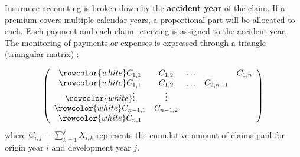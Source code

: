 \begin{f}
	
	Insurance accounting is broken down by the \textbf{accident year} of the claim. 
	If a premium covers multiple calendar years, a proportional part will be allocated to each.
	Each payment and each claim reserving is assigned to the accident year. 
	The monitoring of payments or expenses is expressed through a triangle (triangular matrix) :
	
	\[
	\left(\begin{array}{ccccc}
		\rowcolor{white}	C_{1,1} & C_{1,2} & \ldots & & C_{1, n} \\
		\rowcolor{white}	C_{1,1} & C_{1,2} & \ldots & C_{2, n-1} \\
		\rowcolor{white}	\vdots & \vdots & & \\
		\rowcolor{white}	C_{n-1,1} & C_{n-1,2} & & \\
		\rowcolor{white}	C_{n, 1} & & &
	\end{array}\right)
	\]
	where \(C_{i, j}=\sum_{k=1}^{j} X_{i, k}\) represents the cumulative amount of claims paid for origin year \(i\) and development year \(j\).
	
\end{f}


